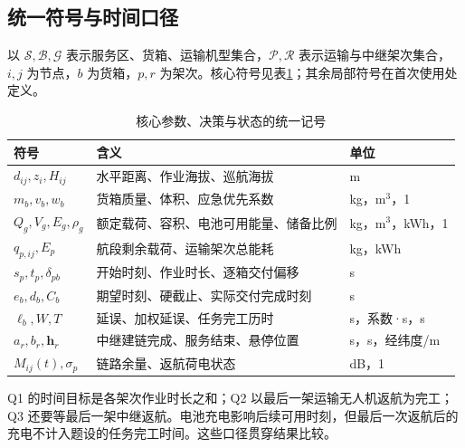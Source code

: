 \subsection{统一符号与时间口径}
以 $\mathcal S,\mathcal B,\mathcal G$ 表示服务区、货箱、运输机型集合，$\mathcal P,\mathcal R$ 表示运输与中继架次集合，$i,j$ 为节点，$b$ 为货箱，$p,r$ 为架次。核心符号见表\ref{tab:symbols}；其余局部符号在首次使用处定义。
\begin{table}[htbp]\centering\caption{核心参数、决策与状态的统一记号}\label{tab:symbols}
\begin{tabularx}{\linewidth}{lXl}\toprule
符号 & 含义 & 单位\\\midrule
$d_{ij},z_i,H_{ij}$ & 水平距离、作业海拔、巡航海拔 & m\\
$m_b,v_b,w_b$ & 货箱质量、体积、应急优先系数 & kg，m$^3$，1\\
$Q_g,V_g,E_g,\rho_g$ & 额定载荷、容积、电池可用能量、储备比例 & kg，m$^3$，kWh，1\\
$q_{p,ij},E_p$ & 航段剩余载荷、运输架次总能耗 & kg，kWh\\
$s_p,t_p,\delta_{pb}$ & 开始时刻、作业时长、逐箱交付偏移 & s\\
$e_b,d_b,C_b$ & 期望时刻、硬截止、实际交付完成时刻 & s\\
$\ell_b,W,T$ & 延误、加权延误、任务完工历时 & s，系数·s，s\\
$a_r,b_r,\symbf h_r$ & 中继建链完成、服务结束、悬停位置 & s，s，经纬度/m\\
$M_{ij}(t),\sigma_p$ & 链路余量、返航荷电状态 & dB，1\\\bottomrule
\end{tabularx}\end{table}
Q1 的时间目标是各架次作业时长之和；Q2 以最后一架运输无人机返航为完工；Q3 还要等最后一架中继返航。电池充电影响后续可用时刻，但最后一次返航后的充电不计入题设的任务完工时间。这些口径贯穿结果比较。
\FloatBarrier

